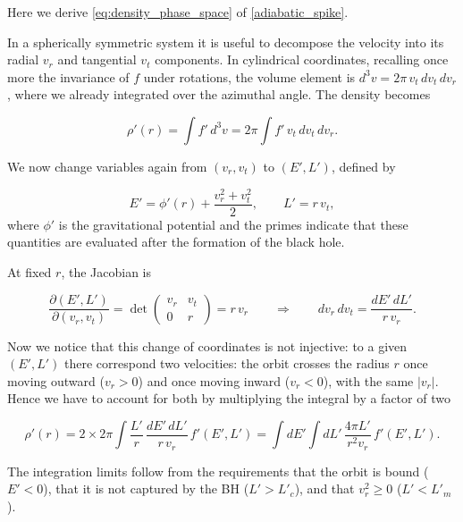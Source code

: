 Here we derive \cref{eq:density_phase_space} of \cref{adiabatic_spike}.

In a spherically symmetric system it is useful to decompose the
velocity into its radial $v_r$ and tangential $v_t$ components. 
In cylindrical coordinates, recalling once more the invariance of $f$ under rotations,
the volume element is $d^3v = 2\pi\, v_t\, dv_t\, dv_r$, where we already integrated over the azimuthal angle.
The density becomes

\begin{equation} \label{density_velocities}
\rho'(r) = \int f'\, d^3v = 2\pi \int f'\, v_t\, dv_t\, dv_r .
\end{equation}

We now change variables again from $(v_r, v_t)$ to $(E', L')$, defined by

\begin{equation}
E' = \phi'(r) + \frac{v_r^2 + v_t^2}{2},
\qquad
L' = r\, v_t ,
\end{equation}
where $\phi'$ is the gravitational potential and the primes indicate that these quantities are evaluated after the formation of the black hole.

At fixed $r$, the Jacobian is

\begin{equation}
\frac{\partial(E', L')}{\partial(v_r, v_t)}
=
\det
\begin{pmatrix}
v_r & v_t \\
0 & r
\end{pmatrix}
= r\, v_r
\qquad\Longrightarrow\qquad
dv_r\, dv_t = \frac{dE'\, dL'}{r\, v_r} .
\end{equation}

Now we notice that this change of coordinates is not injective: 
to a given $(E',L')$ there correspond two velocities: the
orbit crosses the radius $r$ once moving outward ($v_r > 0$) and once moving
inward ($v_r < 0$), with the same $|v_r|$.
Hence we have to account for both by multiplying the integral by a factor of two

\begin{equation}
\rho'(r)
=
2 \times 2\pi \int \frac{L'}{r}\, \frac{dE'\, dL'}{r\, v_r}\, f'(E',L')
=
\int dE' \int dL'\, \frac{4\pi L'}{r^2 v_r}\, f'(E',L') .
\end{equation}

The integration limits follow from the
requirements that the orbit is bound ($E' < 0$), that it is not captured by
the BH ($L' > L'_c$), and that $v_r^2 \ge 0$ ($L' < L'_m$).




